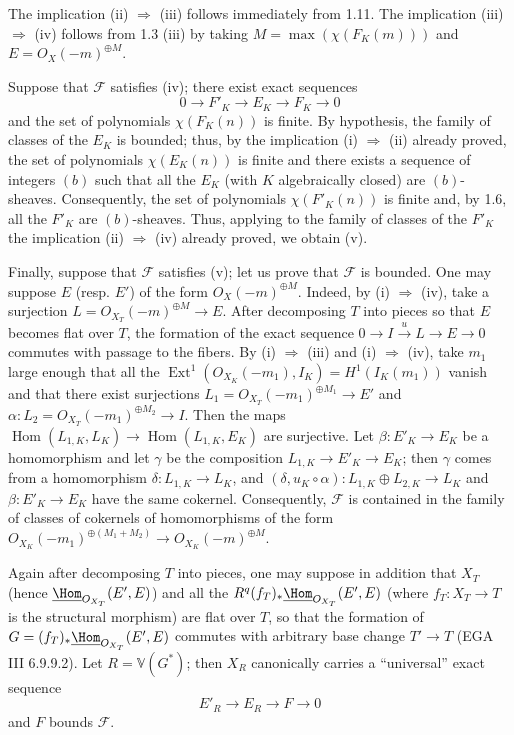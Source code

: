 The implication (ii) \(\Rightarrow\) (iii) follows immediately from 1.11. The implication (iii) \(\Rightarrow\) (iv) follows from 1.3 (iii) by taking \(M=\max(\chi(F_K(m)))\) and \(E={O}_X(-m)^{\oplus M}\).

Suppose that \(\mathcal F\) satisfies (iv); there exist exact sequences
\[
0\longrightarrow F'_K\longrightarrow E_K\longrightarrow F_K\longrightarrow0
\]
and the set of polynomials \(\chi(F_K(n))\) is finite. By hypothesis, the family of classes of the \(E_K\) is bounded; thus, by the implication (i) \(\Rightarrow\) (ii) already proved, the set of polynomials \(\chi(E_K(n))\) is finite and there exists a sequence of integers \((b)\) such that all the \(E_K\) (with \(K\) algebraically closed) are \((b)\)-sheaves. Consequently, the set of polynomials \(\chi(F'_K(n))\) is finite and, by 1.6, all the \(F'_K\) are \((b)\)-sheaves. Thus, applying to the family of classes of the \(F'_K\) the implication (ii) \(\Rightarrow\) (iv) already proved, we obtain (v).

Finally, suppose that \(\mathcal F\) satisfies (v); let us prove that \(\mathcal F\) is bounded. One may suppose \(E\) (resp. \(E'\)) of the form \({O}_X(-m)^{\oplus M}\). Indeed,
%
by (i) \(\Rightarrow\) (iv), take a surjection \(L={O}_{X_T}(-m)^{\oplus M}\longrightarrow E\). After decomposing \(T\) into pieces so that \(E\) becomes flat over \(T\), the formation of the exact sequence \(0\longrightarrow I\xrightarrow{u}L\longrightarrow E\longrightarrow0\) commutes with passage to the fibers. By (i) \(\Rightarrow\) (iii) and (i) \(\Rightarrow\) (iv), take \(m_1\) large enough that all the \(\operatorname{Ext}^1({O}_{X_K}(-m_1),I_K)=H^1(I_K(m_1))\) vanish and that there exist surjections \(L_1={O}_{X_T}(-m_1)^{\oplus M_1}\longrightarrow E'\) and \(\alpha:L_2={O}_{X_T}(-m_1)^{\oplus M_2}\longrightarrow I\). Then the maps \(\operatorname{Hom}(L_{1,K},L_K)\longrightarrow \operatorname{Hom}(L_{1,K},E_K)\) are surjective. Let \(\beta:E'_K\to E_K\) be a homomorphism and let \(\gamma\) be the composition \(L_{1,K}\to E'_K\to E_K\); then \(\gamma\) comes from a homomorphism \(\delta:L_{1,K}\to L_K\), and $(\delta,u_K\circ\alpha):L_{1,K}\oplus L_{2,K}\longrightarrow L_K$ and \(\beta:E'_K\to E_K\) have the same cokernel. Consequently, \(\mathcal F\) is contained in the family of classes of cokernels of homomorphisms of the form \({O}_{X_K}(-m_1)^{\oplus(M_1+M_2)}\longrightarrow {O}_{X_K}(-m)^{\oplus M}\).

Again after decomposing \(T\) into pieces, one may suppose in addition that \(X_T\) (hence \(\underline{\Hom}_{{O}_{X_T}}(E',E)\)) and all the \(R^q(f_T)_*\underline{\Hom}_{{O}_{X_T}}(E',E)\) (where \(f_T:X_T\to T\) is the structural morphism) are flat over \(T\), so that the formation of \(G=(f_T)_*\underline{\Hom}_{{O}_{X_T}}(E',E)\) commutes with arbitrary base change \(T'\to T\) (EGA III 6.9.9.2). Let $R=\mathbb V(G^*)$; then \(X_R\) canonically carries a ``universal'' exact sequence
\[
E'_R\longrightarrow E_R\longrightarrow F\longrightarrow0
\]
and \(F\) bounds \(\mathcal F\).

